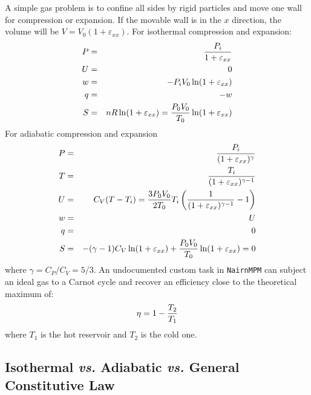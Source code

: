 \documentclass[11pt]{book}
\def\e#1{\varepsilon_{#1}}
\begin{document}
A simple gas problem is to confine all sides by rigid particles and move one wall for compression or expansion. If the movable wall is in the $x$ direction, the volume will be $V = V_0(1+\e{xx})$. For isothermal compression and expansion:
\begin{eqnarray}
    P & = & {P_i\over 1+\e{xx}} \\
    U & = & 0 \\
    w & = & -P_iV_0\ln(1+\e{xx}) \\
    q & = & -w \\
    S & = & nR\ln(1+\e{xx}) = {P_0 V_0\over T_0}\ln(1+\e{xx})
\end{eqnarray}
For adiabatic compression and expansion
\begin{eqnarray}
    P & = & {P_i\over (1+\e{xx})^\gamma} \\
    T & = & {T_i\over (1+\e{xx})^{\gamma-1}} \\
    U & = & C_V(T - T_i) 
               = {3P_0V_0\over 2T_0}T_i\left({1\over (1+\e{xx})^{\gamma-1}}-1\right) \\
    w & = & U \\
    q & = & 0 \\
    S & = & -(\gamma-1)C_V\ln(1+\e{xx}) + {P_0 V_0\over T_0}\ln(1+\e{xx}) = 0
\end{eqnarray}
where $\gamma=C_P/C_V=5/3$. An undocumented custom task in {\tt NairnMPM} can subject an ideal gas to a Carnot cycle and recover an efficiency close to the theoretical maximum of:
\begin{equation}
       \eta = 1 - {T_2\over T_1}
\end{equation}
where $T_1$ is the hot reservoir and $T_2$ is the cold one.

\subsection{Isothermal {\em vs.} Adiabatic {\em vs.} General Constitutive Law}
\end{document}
